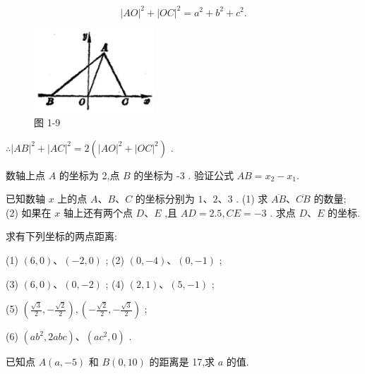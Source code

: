 \documentclass[lang=cn,newtx,10pt,scheme=chinese]{elegantbook}
\begin{document}
\[
    {\left| AO\right| }^{2} + {\left| OC\right| }^{2} = {a}^{2} + {b}^{2} + {c}^{2}.
\]

\begin{figure}[h]
  \centering
  \includegraphics[max width=0.4\textwidth]{images/01912cc2-ffb6-728e-9ae7-b113ff05c64b_11_761140.jpg}
  \caption{图 1-9}
\end{figure}



\(\therefore {\left| AB\right| }^{2} + {\left| AC\right| }^{2} = 2\left( {{\left| AO\right| }^{2} + {\left| OC\right| }^{2}}\right)\) .

\begin{problemset}[练习]

\item 数轴上点 \(A\) 的坐标为 2,点 \(B\) 的坐标为 -3 . 验证公式 \({AB} = {x}_{2} - {x}_{1}.\)

\item 已知数轴 \(x\) 上的点 \(A\text{、}B\text{、}C\) 的坐标分别为 \(1\text{、}2\text{、}3\) . (1) 求 \(\overline{AB}\text{、}\overline{CB}\) 的数量; (2) 如果在 \(x\) 轴上还有两个点 \(D\text{、}E\) ,且 \({AD} = {2.5},{CE} = - 3\) . 求点 \(D\text{、}E\) 的坐标.

\item 求有下列坐标的两点距离:

(1) \(\left( {6,0}\right) \text{、}\left( {-2,0}\right)\) ; (2) \(\left( {0, - 4}\right) \text{、}\left( {0, - 1}\right)\) ;

(3) \(\left( {6,0}\right) \text{、}\left( {0, - 2}\right)\) ; (4) \(\left( {2,1}\right) \text{、}\left( {5, - 1}\right)\) ;

(5) \(\left( {\frac{\sqrt{3}}{2}, - \frac{\sqrt{2}}{2}}\right) ,\left( {-\frac{\sqrt{2}}{2}, - \frac{\sqrt{3}}{2}}\right)\) ;

(6) \(\left( {a{b}^{2},{2abc}}\right) \text{、}\left( {a{c}^{2},0}\right)\) .

\item 已知点 \(A\left( {a, - 5}\right)\) 和 \(B\left( {0,{10}}\right)\) 的距离是 17,求 \(a\) 的值.

\end{problemset}
\end{document}
